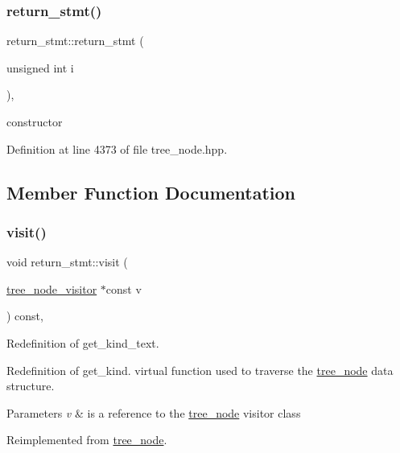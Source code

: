 \subsubsection{\texorpdfstring{return\+\_\+stmt()}{return\_stmt()}}
{\footnotesize\ttfamily return\+\_\+stmt\+::return\+\_\+stmt (\begin{DoxyParamCaption}\item[{unsigned int}]{i }\end{DoxyParamCaption})\hspace{0.3cm}{\ttfamily [inline]}, {\ttfamily [explicit]}}



constructor 



Definition at line 4373 of file tree\+\_\+node.\+hpp.



\subsection{Member Function Documentation}
\mbox{\label{structreturn__stmt_aef0ab55c5af1b107e05eddd7f4b4a88e}} 
\subsubsection{\texorpdfstring{visit()}{visit()}}
{\footnotesize\ttfamily void return\+\_\+stmt\+::visit (\begin{DoxyParamCaption}\item[{\hyperlink{classtree__node__visitor}{tree\+\_\+node\+\_\+visitor} $\ast$const}]{v }\end{DoxyParamCaption}) const\hspace{0.3cm}{\ttfamily [override]}, {\ttfamily [virtual]}}



Redefinition of get\+\_\+kind\+\_\+text. 

Redefinition of get\+\_\+kind. virtual function used to traverse the \hyperlink{classtree__node}{tree\+\_\+node} data structure. 
\begin{DoxyParams}{Parameters}
{\em v} & is a reference to the \hyperlink{classtree__node}{tree\+\_\+node} visitor class \\
\hline
\end{DoxyParams}


Reimplemented from \hyperlink{classtree__node_aa9abba3f1b30e0be80b4a56b188c6ecc}{tree\+\_\+node}.



